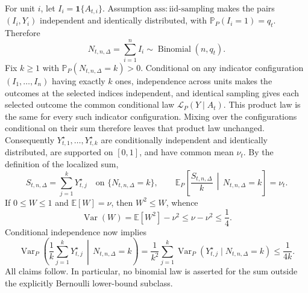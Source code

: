 For unit \(i\), let \(I_i=\mathbf1\{A_{t,i}\}\).  Assumption \(\mathrm{ass:iid\text{-}sampling}\) makes the pairs \((I_i,Y_i)\) independent and identically distributed, with \(\mathbb P_P(I_i=1)=q_t\).  Therefore
\[
 N_{t,n,\Delta}=\sum_{i=1}^n I_i\sim\operatorname{Binomial}(n,q_t).
\]
Fix \(k\geq1\) with \(\mathbb P_P(N_{t,n,\Delta}=k)>0\).  Conditional on any indicator configuration \((I_1,\ldots,I_n)\) having exactly \(k\) ones, independence across units makes the outcomes at the selected indices independent, and identical sampling gives each selected outcome the common conditional law \(\mathcal L_P(Y\mid A_t)\).  This product law is the same for every such indicator configuration.  Mixing over the configurations conditional on their sum therefore leaves that product law unchanged.  Consequently \(Y_{t,1}^{\star},\ldots,Y_{t,k}^{\star}\) are conditionally independent and identically distributed, are supported on \([0,1]\), and have common mean \(\nu_t\).  By the definition of the localized sum,
\[
 S_{t,n,\Delta}=\sum_{j=1}^kY_{t,j}^{\star}
 \quad\text{on }\{N_{t,n,\Delta}=k\},
 \qquad
 \mathbb E_P\!\left[\frac{S_{t,n,\Delta}}k\,\middle|\,N_{t,n,\Delta}=k\right]=\nu_t.
\]
If \(0\leq W\leq1\) and \(\mathbb E[W]=\nu\), then \(W^2\leq W\), whence
\[
 \operatorname{Var}(W)=\mathbb E[W^2]-\nu^2
 \leq\nu-\nu^2\leq\frac14.
\]
Conditional independence now implies
\[
 \operatorname{Var}_P\!\left(\frac1k\sum_{j=1}^kY_{t,j}^{\star}\,\middle|\,N_{t,n,\Delta}=k\right)
 =\frac1{k^2}\sum_{j=1}^k\operatorname{Var}_P(Y_{t,j}^{\star}\mid N_{t,n,\Delta}=k)
 \leq\frac1{4k}.
\]
All claims follow.  In particular, no binomial law is asserted for the sum outside the explicitly Bernoulli lower-bound subclass.